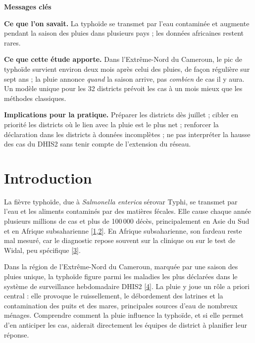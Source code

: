 \documentclass[11pt]{article}
\begin{document}
\begin{tcolorbox}[colback=white,colframe=black,boxrule=0.5pt,arc=0pt,left=8pt,right=8pt,top=5pt,bottom=5pt,fontupper=\small]
{\sffamily\bfseries\color{ora}Messages clés}\par\vspace{2pt}
\textbf{Ce que l'on savait.} La typhoïde se transmet par l'eau contaminée et augmente pendant la saison des pluies dans plusieurs pays ; les données africaines restent rares.\par
\textbf{Ce que cette étude apporte.} Dans l'Extrême-Nord du Cameroun, le pic de typhoïde survient environ deux mois après celui des pluies, de façon régulière sur sept ans ; la pluie annonce \textit{quand} la saison arrive, pas \textit{combien} de cas il y aura. Un modèle unique pour les 32 districts prévoit les cas à un mois mieux que les méthodes classiques.\par
\textbf{Implications pour la pratique.} Préparer les districts dès juillet ; cibler en priorité les districts où le lien avec la pluie est le plus net ; renforcer la déclaration dans les districts à données incomplètes ; ne pas interpréter la hausse des cas du DHIS2 sans tenir compte de l'extension du réseau.
\end{tcolorbox}

\section{Introduction}
La fièvre typhoïde, due à \textit{Salmonella enterica} sérovar Typhi, se transmet par l'eau et les aliments contaminés par des matières fécales. Elle cause chaque année plusieurs millions de cas et plus de 100\,000 décès, principalement en Asie du Sud et en Afrique subsaharienne [\hyperlink{ref1}{1},\hyperlink{ref2}{2}]. En Afrique subsaharienne, son fardeau reste mal mesuré, car le diagnostic repose souvent sur la clinique ou sur le test de Widal, peu spécifique [\hyperlink{ref3}{3}].

Dans la région de l'Extrême-Nord du Cameroun, marquée par une saison des pluies unique, la typhoïde figure parmi les maladies les plus déclarées dans le système de surveillance hebdomadaire DHIS2 [\hyperlink{ref4}{4}]. La pluie y joue un rôle a priori central : elle provoque le ruissellement, le débordement des latrines et la contamination des puits et des mares, principales sources d'eau de nombreux ménages. Comprendre comment la pluie influence la typhoïde, et si elle permet d'en anticiper les cas, aiderait directement les équipes de district à planifier leur réponse.
\end{document}
